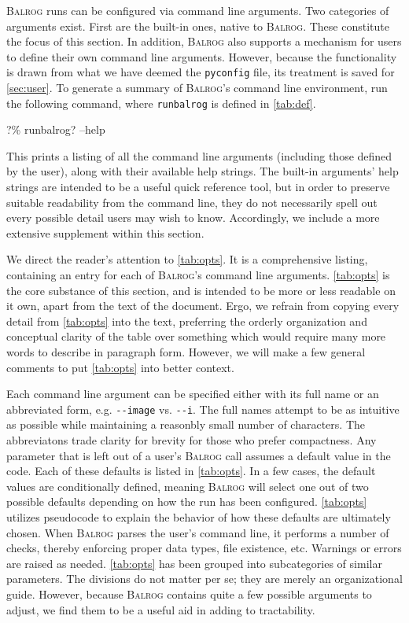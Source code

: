 \documentclass[12pt]{book}
\newcommand{\codett}[1]{\lstinline{#1}}
\newcommand{\pyconfig}{\codett{pyconfig}}
\newcommand{\balrog}{\textsc{Balrog}}
\newcommand{\opt}[1]{\codett{--#1}}
\newcommand{\bcmd}{\% runbalrog}
\begin{document}
\balrog{} runs can be configured via command line arguments.
Two categories of arguments exist. 
First are the built-in ones, native to \balrog{}.
These constitute the focus of this section.
In addition, \balrog{} also supports a mechanism for users to define their own command line arguments.
However, because the functionality is drawn from what we have deemed the \pyconfig{} file,
its treatment is saved for \autoref{sec:user}.
To generate a summary of \balrog{}'s command line environment, run the following command,
where \codett{runbalrog} is defined in \autoref{tab:def}.

\begin{cmdline}
?\bcmd? --help
\end{cmdline}
This prints a listing of all the command line arguments (including those defined by the user), 
along with their available help strings.
The built-in arguments' help strings are intended to be a useful quick reference tool,
but in order to preserve suitable readability from the command line, 
they do not necessarily spell out every possible detail users may wish to know.
Accordingly, we include a more extensive supplement within this section.

We direct the reader's attention to \autoref{tab:opts}.
It is a comprehensive listing, containing an entry for each of \balrog{}'s command line arguments.
\autoref{tab:opts} is the core substance of this section,
and is intended to be more or less readable on it own, apart from the text of the document.
Ergo, we refrain from copying every detail from \autoref{tab:opts} into the text, 
preferring the orderly organization and conceptual clarity
of the table over something which would require many more words to describe in paragraph form.
However, we will make a few general comments to put \autoref{tab:opts} into better context.

Each command line argument can be specified either with its full name or an abbreviated form, e.g. \opt{image} vs. \opt{i}.
The full names attempt to be as intuitive as possible while maintaining a reasonbly small number of characters.
The abbreviatons trade clarity for brevity for those who prefer compactness. 
Any parameter that  is left out of a user's \balrog{} call assumes a default value in the code.
Each of these defaults is listed in \autoref{tab:opts}. 
In a few cases, the default values are conditionally defined, meaning \balrog{} will select one out of
two possible defaults depending on how the run has been configured.
\autoref{tab:opts} utilizes pseudocode to explain the behavior of how these defaults are ultimately chosen.
When \balrog{} parses the user's command line, it performs a number of checks, 
thereby enforcing proper data types, file existence, etc.
Warnings or errors are raised as needed.
\autoref{tab:opts} has been grouped into subcategories of similar parameters.
The divisions do not matter per se; they are merely an organizational guide.
However, because \balrog{} contains quite a few possible arguments to adjust,
we find them to be a useful aid in adding to tractability.
\end{document}
